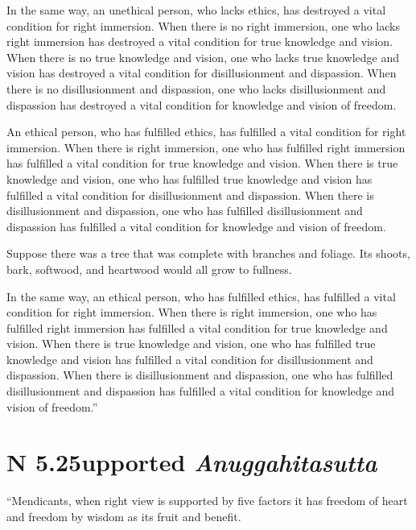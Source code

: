 \documentclass[12pt,openany]{book}%
\newcommand*{\suttatitleacronym}[1]{\smaller[2]{#1}\vspace*{.3em}}
\newcommand*{\suttatitletranslation}[1]{\linebreak{#1}}
\newcommand*{\suttatitleroot}[1]{\linebreak\smaller[2]\itshape{#1}}
\newcommand*{\tocacronym}[1]{\hspace*{-3.3em}{#1}\quad}
\newcommand*{\toctranslation}[1]{#1}
\newcommand*{\tocroot}[1]{(\textit{#1})}
\begin{document}
In the same way, an unethical person, who lacks ethics, has destroyed a vital condition for right immersion. When there is no right immersion, one who lacks right immersion has destroyed a vital condition for true knowledge and vision. When there is no true knowledge and vision, one who lacks true knowledge and vision has destroyed a vital condition for disillusionment and dispassion. When there is no disillusionment and dispassion, one who lacks disillusionment and dispassion has destroyed a vital condition for knowledge and vision of freedom. 

An ethical person, who has fulfilled ethics, has fulfilled a vital condition for right immersion. When there is right immersion, one who has fulfilled right immersion has fulfilled a vital condition for true knowledge and vision. When there is true knowledge and vision, one who has fulfilled true knowledge and vision has fulfilled a vital condition for disillusionment and dispassion. When there is disillusionment and dispassion, one who has fulfilled disillusionment and dispassion has fulfilled a vital condition for knowledge and vision of freedom. 

Suppose there was a tree that was complete with branches and foliage. Its shoots, bark, softwood, and heartwood would all grow to fullness. 

In the same way, an ethical person, who has fulfilled ethics, has fulfilled a vital condition for right immersion. When there is right immersion, one who has fulfilled right immersion has fulfilled a vital condition for true knowledge and vision. When there is true knowledge and vision, one who has fulfilled true knowledge and vision has fulfilled a vital condition for disillusionment and dispassion. When there is disillusionment and dispassion, one who has fulfilled disillusionment and dispassion has fulfilled a vital condition for knowledge and vision of freedom.” 

%
\section*{{\suttatitleacronym AN 5.25}{\suttatitletranslation Supported }{\suttatitleroot Anuggahitasutta}}
\addcontentsline{toc}{section}{\tocacronym{AN 5.25} \toctranslation{Supported } \tocroot{Anuggahitasutta}}

“Mendicants, when right view is supported by five factors it has freedom of heart and freedom by wisdom as its fruit and benefit. 
\end{document}
